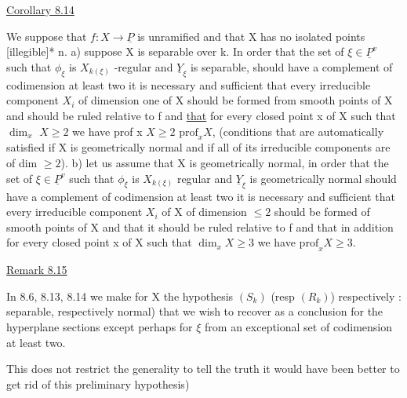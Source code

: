 
\uline{Corollary 8.14}

We suppose that $f\colon X \to \underline{P}$ is unramified and that X has no
isolated points [illegible]* n.
a) suppose X is separable over k.  In order that the set of $\xi \in \underline{P}^{v}$
such that $\phi_{\xi}$ is $X_{k(\xi)}$ -regular and $\underline{Y}_{\xi}$ is separable, should have a
complement of codimension at least two it is necessary and
sufficient that every irreducible component $X_{i}$ of dimension one of
X should be formed from smooth points of X and should be ruled
relative to f and \uline{that} for every closed point x of X such that $\dim_{x}$
$X \geq 2$ we have prof x $X \geq 2$ $\mathrm{prof}_{x}X$, (conditions that are
automatically satisfied if X is geometrically normal and if all of
its irreducible components are of dim $\geq 2$).
b) let us assume that X is geometrically normal, in order that the
set of $\xi \in \underline{P}^{v}$ such that $\phi_{\xi}$ is $X_{k(\xi)}$ regular and $\underline{Y}_{\xi}$ is geometrically
normal should have a complement of codimension at least two it is
necessary and sufficient that every irreducible component $X_{i}$ of X
of dimension $\leq 2$ should be formed of smooth points of X and that
it should be ruled relative to f and that in addition for every
closed point x of X such that $\dim_{x} X \geq 3$ we have $\mathrm{prof}_{x} X \geq 3$.

\uline{Remark 8.15}

In 8.6, 8.13, 8.14 we make for X the hypothesis $(S_{k})$ (resp
$(R_{k})$) respectively : separable, respectively normal) that we wish
to recover as a conclusion for the hyperplane sections except
perhaps for $\xi$ from an exceptional set of codimension at least two.

This does not restrict the generality to tell the truth it
would have been better to get rid of this preliminary hypothesis)

